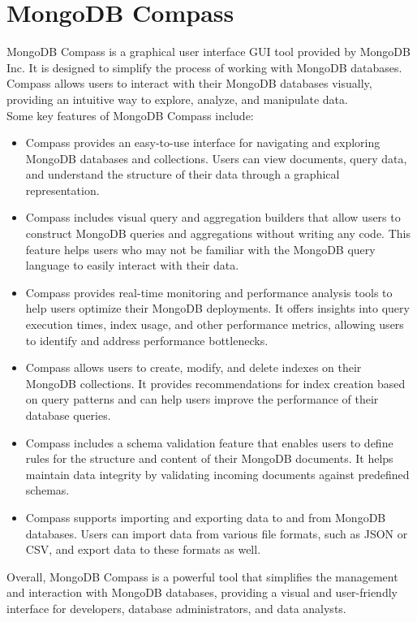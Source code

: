 \section{MongoDB Compass}
MongoDB Compass is a graphical user interface \ac{GUI} tool provided by MongoDB Inc. It is designed to simplify the process of working with MongoDB databases. Compass allows users to interact with their MongoDB databases visually, providing an intuitive way to explore, analyze, and manipulate data.\vspace{5mm} \\
Some key features of MongoDB Compass include:
\begin{itemize}
  \item Compass provides an easy-to-use interface for navigating and exploring MongoDB databases and collections. Users can view documents, query data, and understand the structure of their data through a graphical representation.
  \item Compass includes visual query and aggregation builders that allow users to construct MongoDB queries and aggregations without writing any code. This feature helps users who may not be familiar with the MongoDB query language to easily interact with their data.
  \item Compass provides real-time monitoring and performance analysis tools to help users optimize their MongoDB deployments. It offers insights into query execution times, index usage, and other performance metrics, allowing users to identify and address performance bottlenecks.
  \item Compass allows users to create, modify, and delete indexes on their MongoDB collections. It provides recommendations for index creation based on query patterns and can help users improve the performance of their database queries.
  \item Compass includes a schema validation feature that enables users to define rules for the structure and content of their MongoDB documents. It helps maintain data integrity by validating incoming documents against predefined schemas.
  \item Compass supports importing and exporting data to and from MongoDB databases. Users can import data from various file formats, such as JSON or CSV, and export data to these formats as well.
\end{itemize}
Overall, MongoDB Compass is a powerful tool that simplifies the management and interaction with MongoDB databases, providing a visual and user-friendly interface for developers, database administrators, and data analysts.
